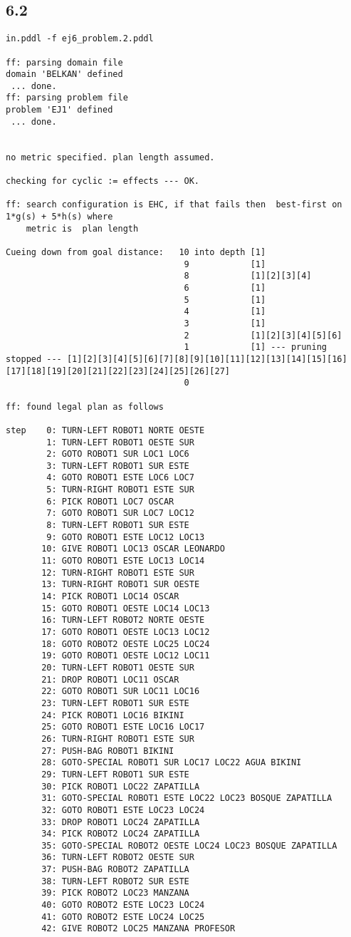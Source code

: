 \documentclass{article}
\begin{document}
\subsection*{6.2}
\begin{lstlisting}
in.pddl -f ej6_problem.2.pddl

ff: parsing domain file
domain 'BELKAN' defined
 ... done.
ff: parsing problem file
problem 'EJ1' defined
 ... done.


no metric specified. plan length assumed.

checking for cyclic := effects --- OK.

ff: search configuration is EHC, if that fails then  best-first on 1*g(s) + 5*h(s) where
    metric is  plan length

Cueing down from goal distance:   10 into depth [1]
                                   9            [1]
                                   8            [1][2][3][4]
                                   6            [1]
                                   5            [1]
                                   4            [1]
                                   3            [1]
                                   2            [1][2][3][4][5][6]
                                   1            [1] --- pruning stopped --- [1][2][3][4][5][6][7][8][9][10][11][12][13][14][15][16][17][18][19][20][21][22][23][24][25][26][27]
                                   0            

ff: found legal plan as follows

step    0: TURN-LEFT ROBOT1 NORTE OESTE
        1: TURN-LEFT ROBOT1 OESTE SUR
        2: GOTO ROBOT1 SUR LOC1 LOC6
        3: TURN-LEFT ROBOT1 SUR ESTE
        4: GOTO ROBOT1 ESTE LOC6 LOC7
        5: TURN-RIGHT ROBOT1 ESTE SUR
        6: PICK ROBOT1 LOC7 OSCAR
        7: GOTO ROBOT1 SUR LOC7 LOC12
        8: TURN-LEFT ROBOT1 SUR ESTE
        9: GOTO ROBOT1 ESTE LOC12 LOC13
       10: GIVE ROBOT1 LOC13 OSCAR LEONARDO
       11: GOTO ROBOT1 ESTE LOC13 LOC14
       12: TURN-RIGHT ROBOT1 ESTE SUR
       13: TURN-RIGHT ROBOT1 SUR OESTE
       14: PICK ROBOT1 LOC14 OSCAR
       15: GOTO ROBOT1 OESTE LOC14 LOC13
       16: TURN-LEFT ROBOT2 NORTE OESTE
       17: GOTO ROBOT1 OESTE LOC13 LOC12
       18: GOTO ROBOT2 OESTE LOC25 LOC24
       19: GOTO ROBOT1 OESTE LOC12 LOC11
       20: TURN-LEFT ROBOT1 OESTE SUR
       21: DROP ROBOT1 LOC11 OSCAR
       22: GOTO ROBOT1 SUR LOC11 LOC16
       23: TURN-LEFT ROBOT1 SUR ESTE
       24: PICK ROBOT1 LOC16 BIKINI
       25: GOTO ROBOT1 ESTE LOC16 LOC17
       26: TURN-RIGHT ROBOT1 ESTE SUR
       27: PUSH-BAG ROBOT1 BIKINI
       28: GOTO-SPECIAL ROBOT1 SUR LOC17 LOC22 AGUA BIKINI
       29: TURN-LEFT ROBOT1 SUR ESTE
       30: PICK ROBOT1 LOC22 ZAPATILLA
       31: GOTO-SPECIAL ROBOT1 ESTE LOC22 LOC23 BOSQUE ZAPATILLA
       32: GOTO ROBOT1 ESTE LOC23 LOC24
       33: DROP ROBOT1 LOC24 ZAPATILLA
       34: PICK ROBOT2 LOC24 ZAPATILLA
       35: GOTO-SPECIAL ROBOT2 OESTE LOC24 LOC23 BOSQUE ZAPATILLA
       36: TURN-LEFT ROBOT2 OESTE SUR
       37: PUSH-BAG ROBOT2 ZAPATILLA
       38: TURN-LEFT ROBOT2 SUR ESTE
       39: PICK ROBOT2 LOC23 MANZANA
       40: GOTO ROBOT2 ESTE LOC23 LOC24
       41: GOTO ROBOT2 ESTE LOC24 LOC25
       42: GIVE ROBOT2 LOC25 MANZANA PROFESOR
     


\end{lstlisting}
\end{document}
